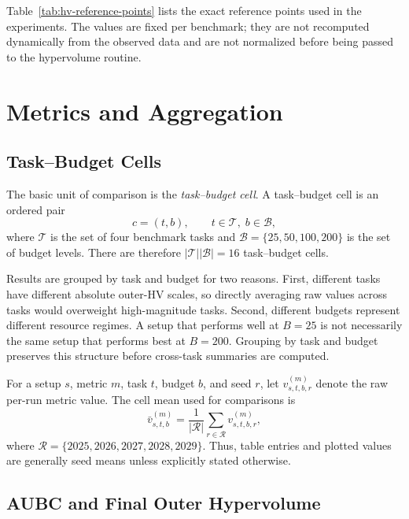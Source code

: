 \documentclass[../main.tex]{subfiles}
\begin{document}
Table~\ref{tab:hv-reference-points} lists the exact reference points used in the experiments. The values are fixed per benchmark; they are not recomputed dynamically from the observed data and are not normalized before being passed to the hypervolume routine.



\section{Metrics and Aggregation}

\subsection{Task--Budget Cells}

The basic unit of comparison is the \emph{task--budget cell}. A task--budget cell is an ordered pair
\begin{equation}
  c=(t,b), \qquad t\in\mathcal{T},\; b\in\mathcal{B},
\end{equation}
where $\mathcal{T}$ is the set of four benchmark tasks and $\mathcal{B}=\{25,50,100,200\}$ is the set of budget levels. There are therefore $|\mathcal{T}||\mathcal{B}|=16$ task--budget cells.

Results are grouped by task and budget for two reasons. First, different tasks have different absolute outer-HV scales, so directly averaging raw values across tasks would overweight high-magnitude tasks. Second, different budgets represent different resource regimes. A setup that performs well at $B=25$ is not necessarily the same setup that performs best at $B=200$. Grouping by task and budget preserves this structure before cross-task summaries are computed.

For a setup $s$, metric $m$, task $t$, budget $b$, and seed $r$, let $v^{(m)}_{s,t,b,r}$ denote the raw per-run metric value. The cell mean used for comparisons is
\begin{equation}
  \bar{v}^{(m)}_{s,t,b}
  =
  \frac{1}{|\mathcal{R}|}
  \sum_{r\in\mathcal{R}} v^{(m)}_{s,t,b,r},
\end{equation}
where $\mathcal{R}=\{2025,2026,2027,2028,2029\}$. Thus, table entries and plotted values are generally seed means unless explicitly stated otherwise.

\subsection{AUBC and Final Outer Hypervolume}
\end{document}
